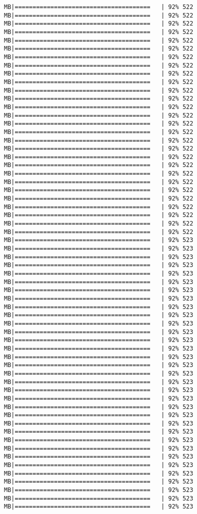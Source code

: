 \documentclass[
]{article}
\begin{document}
\begin{verbatim}
MB|======================================   | 92% 522 MB|======================================   | 92% 522 MB|======================================   | 92% 522 MB|======================================   | 92% 522 MB|======================================   | 92% 522 MB|======================================   | 92% 522 MB|======================================   | 92% 522 MB|======================================   | 92% 522 MB|======================================   | 92% 522 MB|======================================   | 92% 522 MB|======================================   | 92% 522 MB|======================================   | 92% 522 MB|======================================   | 92% 522 MB|======================================   | 92% 522 MB|======================================   | 92% 522 MB|======================================   | 92% 522 MB|======================================   | 92% 522 MB|======================================   | 92% 522 MB|======================================   | 92% 522 MB|======================================   | 92% 522 MB|======================================   | 92% 522 MB|======================================   | 92% 522 MB|======================================   | 92% 522 MB|======================================   | 92% 522 MB|======================================   | 92% 522 MB|======================================   | 92% 522 MB|======================================   | 92% 522 MB|======================================   | 92% 522 MB|======================================   | 92% 523 MB|======================================   | 92% 523 MB|======================================   | 92% 523 MB|======================================   | 92% 523 MB|======================================   | 92% 523 MB|======================================   | 92% 523 MB|======================================   | 92% 523 MB|======================================   | 92% 523 MB|======================================   | 92% 523 MB|======================================   | 92% 523 MB|======================================   | 92% 523 MB|======================================   | 92% 523 MB|======================================   | 92% 523 MB|======================================   | 92% 523 MB|======================================   | 92% 523 MB|======================================   | 92% 523 MB|======================================   | 92% 523 MB|======================================   | 92% 523 MB|======================================   | 92% 523 MB|======================================   | 92% 523 MB|======================================   | 92% 523 MB|======================================   | 92% 523 MB|======================================   | 92% 523 MB|======================================   | 92% 523 MB|======================================   | 92% 523 MB|======================================   | 92% 523 MB|======================================   | 92% 523 MB|======================================   | 92% 523 MB|======================================   | 92% 523 MB|======================================   | 92% 523 MB|======================================   | 92% 523 MB|======================================   | 92% 523 MB|======================================   | 92% 523 
\end{verbatim}
\end{document}
